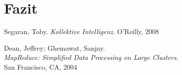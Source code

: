 \documentclass[a4paper]{llncs}
\begin{document}
\section{Fazit}

\begin{thebibliography}{------------}

  Segaran, Toby.
  {\em Kollektive Intelligenz}.
  O'Reilly, 2008

  Dean, Jeffrey; Ghemawat, Sanjay.\\
  {\em MapReduce: Simplified Data Processing on Large Clusters}.\\
  San Francisco, CA, 2004
  
\end{thebibliography}
\end{document}
